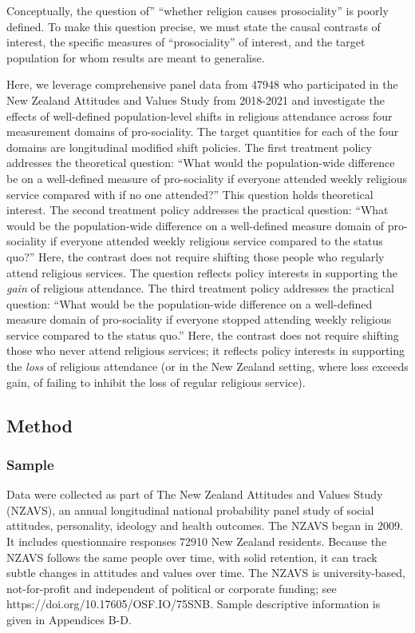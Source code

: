 \documentclass[
  single column]{article}
\begin{document}
Conceptually, the question of'' ``whether religion causes prosociality''
is poorly defined. To make this question precise, we must state the
causal contrasts of interest, the specific measures of ``prosociality''
of interest, and the target population for whom results are meant to
generalise.

Here, we leverage comprehensive panel data from 47948 who participated
in the New Zealand Attitudes and Values Study from 2018-2021 and
investigate the effects of well-defined population-level shifts in
religious attendance across four measurement domains of pro-sociality.
The target quantities for each of the four domains are longitudinal
modified shift policies. The first treatment policy addresses the
theoretical question: ``What would the population-wide difference be on
a well-defined measure of pro-sociality if everyone attended weekly
religious service compared with if no one attended?'' This question
holds theoretical interest. The second treatment policy addresses the
practical question: ``What would be the population-wide difference on a
well-defined measure domain of pro-sociality if everyone attended weekly
religious service compared to the status quo?'' Here, the contrast does
not require shifting those people who regularly attend religious
services. The question reflects policy interests in supporting the
\emph{gain} of religious attendance. The third treatment policy
addresses the practical question: ``What would be the population-wide
difference on a well-defined measure domain of pro-sociality if everyone
stopped attending weekly religious service compared to the status quo.''
Here, the contrast does not require shifting those who never attend
religious services; it reflects policy interests in supporting the
\emph{loss} of religious attendance (or in the New Zealand setting,
where loss exceeds gain, of failing to inhibit the loss of regular
religious service).

\subsection{Method}\label{method}

\subsubsection{Sample}\label{sample}

Data were collected as part of The New Zealand Attitudes and Values
Study (NZAVS), an annual longitudinal national probability panel study
of social attitudes, personality, ideology and health outcomes. The
NZAVS began in 2009. It includes questionnaire responses 72910 New
Zealand residents. Because the NZAVS follows the same people over time,
with solid retention, it can track subtle changes in attitudes and
values over time. The NZAVS is university-based, not-for-profit and
independent of political or corporate funding; see
https://doi.org/10.17605/OSF.IO/75SNB. Sample descriptive information is
given in Appendices B-D.
\end{document}
